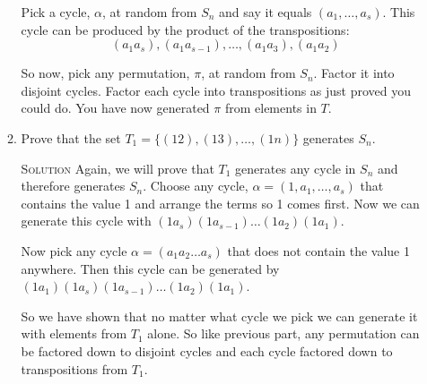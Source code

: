 \documentclass[twoside]{amsart}
\newcommand{\solution}{\textsc{Solution}\xspace}
\begin{document}
\begin{enumerate}[A.]
\begin{enumerate}[1]
      Pick a cycle, $\alpha$, at random from $S_n$ and say it equals
      $(a_1,\ldots,a_s)$. This cycle can be produced by the product
      of the transpositions:
       \[(a_1a_s),(a_1a_{s-1}),\ldots,(a_1a_3),
      (a_1a_2) \]

      So now, pick any permutation, $\pi$, at random from $S_n$. Factor
      it into disjoint cycles. Factor each cycle into transpositions
      as just proved you could do. You have now generated $\pi$
      from elements in $T$.

      \item Prove that the set $T_1=\{(12),(13),\ldots,(1n)\}$
      generates $S_n$.

      \noindent \solution Again, we will prove that $T_1$ generates
      any cycle in $S_n$ and therefore generates $S_n$. Choose
      any cycle, $\alpha=(1,a_1,\ldots,a_s)$ that contains the value 1
      and arrange the terms so 1 comes first. Now we can generate
      this cycle with $(1a_s)(1a_{s-1})\ldots(1a_2)(1a_1)$.

      Now pick any cycle $\alpha=(a_1a_2\ldots a_s)$ that does not contain
      the value 1 anywhere. Then this cycle can be generated by
      $(1a_1)(1a_s)(1a_{s-1})\ldots(1a_2)(1a_1)$.

      So we have shown that no matter what cycle we pick we can generate
      it with elements from $T_1$ alone. So like previous part, any 
      permutation can be factored down to disjoint cycles and each cycle
      factored down to transpositions from $T_1$.



   \end{enumerate}


   
 
\end{enumerate}
\end{document}
